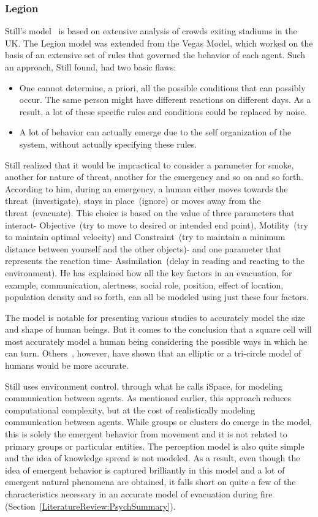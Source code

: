\subsubsection{Legion}

Still's model~\cite{Still:2000tp} is based on extensive analysis of crowds exiting stadiums in the UK. The Legion model was extended from the Vegas Model, which worked on the basis of an extensive set of rules that governed the behavior of each agent. Such an approach, Still found, had two basic flaws:
\begin{itemize}
\item One cannot determine, a priori, all the possible conditions that can possibly occur. The same person might have different reactions on different days. As a result, a lot of these specific rules and conditions could be replaced by noise.
\item A lot of behavior can actually emerge due to the self organization of the system, without actually specifying these rules.
\end{itemize}
Still realized that it would be impractical to consider a parameter for smoke, another for nature of threat, another for the emergency and so on and so forth. According to him, during an emergency, a human either moves towards the threat~(investigate), stays in place~(ignore) or moves away from the threat~(evacuate). This choice is based on the value of three parameters that interact- Objective~(try to move to desired or intended end point), Motility~(try to maintain optimal velocity) and Constraint~(try to maintain a minimum distance between yourself and the other objects)- and one parameter that represents the reaction time- Assimilation~(delay in reading and reacting to the environment). He has explained how all the key factors in an evacuation, for example, communication, alertness, social role, position, effect of location, population density and so forth, can all be modeled using just these four factors.

The model is notable for presenting various studies to accurately model the size and shape of human beings. But it comes to the conclusion that a square cell will most accurately model a human being considering the possible ways in which he can turn. Others~\cite{Thompson:1995tm,Langston:2006kw}, however, have shown that an elliptic or a tri-circle model of humans would be more accurate.

Still uses environment control, through what he calls iSpace, for modeling communication between agents. As mentioned earlier, this approach reduces computational complexity, but at the cost of realistically modeling communication between agents. While groups or clusters do emerge in the model, this is solely the emergent behavior from movement and it is not related to primary groups or particular entities. The perception model is also quite simple and the idea of knowledge spread is not modeled. As a result, even though the idea of emergent behavior is captured brilliantly in this model and a lot of emergent natural phenomena are obtained, it falls short on quite a few of the characteristics necessary in an accurate model of evacuation during fire (Section~\ref{LiteratureReview:PsychSummary}).

